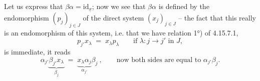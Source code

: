 \documentclass[11pt]{article}
\newcommand{\ux}{\underline{x}}
\newcommand{\id}{\mathrm{id}}
\begin{document}
Let us express that $\beta\alpha = \id_{\ux}$; now we see that $\beta\alpha$ is defined by the endomorphism $(p_j)_{j\in J}$ of the direct system $(x_j)_{j\in J}$ -- the fact that this really is an endomorphism of this system, i.e. that we have relation 1°) of 4.15.7.1,
\[
p_{j'}x_\lambda \;=\; x_\lambda p_\lambda \qquad \text{if } \lambda : j \longrightarrow j' \text{ in } J, %
\]
is immediate, it reads
\[
\alpha_{j'}\underbrace{\beta_{j'}x_\lambda}_{\beta_j} \;=\; \underbrace{x_\lambda\alpha_j}_{\alpha_{j'}}\beta_j\ , \qquad \text{now both sides are equal to } \alpha_{j'}\beta_j.
\]
\end{document}

